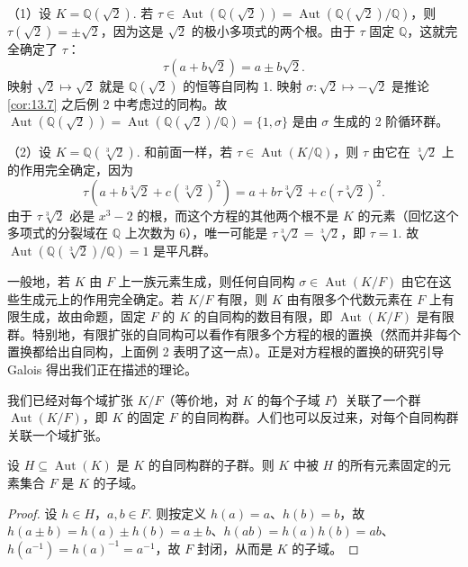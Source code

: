 \begin{example}
（1）设 \(K = \mathbb{Q}(\sqrt{2})\). 若 \(\tau \in \operatorname{Aut}(\mathbb{Q}(\sqrt{2})) = \operatorname{Aut}(\mathbb{Q}(\sqrt{2})/\mathbb{Q})\)，则 \(\tau(\sqrt{2}) = \pm\sqrt{2}\)，因为这是 \(\sqrt{2}\) 的极小多项式的两个根。由于 \(\tau\) 固定 \(\mathbb{Q}\)，这就完全确定了 \(\tau\)：
\[
\tau(a+b\sqrt{2}) = a \pm b\sqrt{2}.
\]
映射 \(\sqrt{2} \mapsto \sqrt{2}\) 就是 \(\mathbb{Q}(\sqrt{2})\) 的恒等自同构 1. 映射 \(\sigma : \sqrt{2} \mapsto -\sqrt{2}\) 是推论 \ref{cor:13.7} 之后例 2 中考虑过的同构。故 \(\operatorname{Aut}(\mathbb{Q}(\sqrt{2})) = \operatorname{Aut}(\mathbb{Q}(\sqrt{2})/\mathbb{Q}) = \{1, \sigma\}\) 是由 \(\sigma\) 生成的 2 阶循环群。

（2）设 \(K = \mathbb{Q}(\sqrt[3]{2})\). 和前面一样，若 \(\tau \in \operatorname{Aut}(K/\mathbb{Q})\)，则 \(\tau\) 由它在 \(\sqrt[3]{2}\) 上的作用完全确定，因为
\[
\tau(a+b\sqrt[3]{2}+c(\sqrt[3]{2})^2) = a+b\tau\sqrt[3]{2}+c(\tau\sqrt[3]{2})^2.
\]
由于 \(\tau\sqrt[3]{2}\) 必是 \(x^3-2\) 的根，而这个方程的其他两个根不是 \(K\) 的元素（回忆这个多项式的分裂域在 \(\mathbb{Q}\) 上次数为 6），唯一可能是 \(\tau\sqrt[3]{2} = \sqrt[3]{2}\)，即 \(\tau = 1\). 故 \(\operatorname{Aut}(\mathbb{Q}(\sqrt[3]{2})/\mathbb{Q}) = 1\) 是平凡群。
\end{example}

一般地，若 \(K\) 由 \(F\) 上一族元素生成，则任何自同构 \(\sigma \in \operatorname{Aut}(K/F)\) 由它在这些生成元上的作用完全确定。若 \(K/F\) 有限，则 \(K\) 由有限多个代数元素在 \(F\) 上有限生成，故由命题，固定 \(F\) 的 \(K\) 的自同构的数目有限，即 \(\operatorname{Aut}(K/F)\) 是有限群。特别地，有限扩张的自同构可以看作有限多个方程的根的置换（然而并非每个置换都给出自同构，上面例 2 表明了这一点）。正是对方程根的置换的研究引导 Galois 得出我们正在描述的理论。

我们已经对每个域扩张 \(K/F\)（等价地，对 \(K\) 的每个子域 \(F\)）关联了一个群 \(\operatorname{Aut}(K/F)\)，即 \(K\) 的固定 \(F\) 的自同构群。人们也可以反过来，对每个自同构群关联一个域扩张。

\begin{proposition}\label{pro:14.3}
设 \(H \subseteq \operatorname{Aut}(K)\) 是 \(K\) 的自同构群的子群。则 \(K\) 中被 \(H\) 的所有元素固定的元素集合 \(F\) 是 \(K\) 的子域。
\end{proposition}

\begin{proof}
设 \(h \in H\)，\(a, b \in F\). 则按定义 \(h(a) = a\)、\(h(b) = b\)，故 \(h(a\pm b) = h(a)\pm h(b) = a\pm b\)、\(h(ab) = h(a)h(b) = ab\)、\(h(a^{-1}) = h(a)^{-1} = a^{-1}\)，故 \(F\) 封闭，从而是 \(K\) 的子域。
\end{proof}

